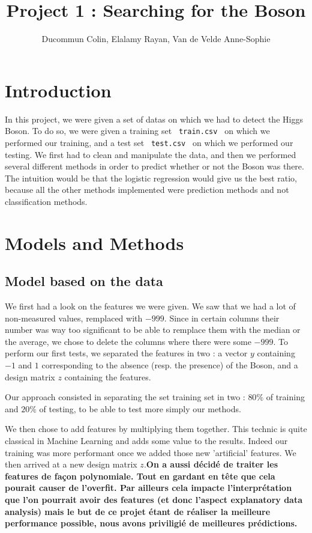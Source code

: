 \documentclass[11pt, oneside]{article}   	%
\title{Project 1 : Searching for the Boson}
\author{Ducommun Colin, Elalamy Rayan, Van de Velde Anne-Sophie}
\begin{document}
\maketitle
\section{Introduction}
In this project, we were given a set of datas on which we had to detect the Higgs Boson. To do so, we were given a training set \lstinline! train.csv ! on which we performed our training, and a test set \lstinline" test.csv " on which we performed our testing. We first had to clean and manipulate the data, and then we performed several different methods in order to predict whether or not the Boson was there. The intuition would be that the logistic regression would give us the best ratio, because all the other methods implemented were prediction methods and not classification methods.

\section{Models and Methods}

\subsection{Model based on the data}
We first had a look on the features we were given. We saw that we had a lot of non-measured values, remplaced with $-999$. Since in certain columns their number was way too significant to be able to remplace them with the median or the average, we chose to delete the columns where there were some $-999$. To perform our first tests, we separated the features in two : a vector $y$ containing $-1$ and $1$ corresponding to the absence (resp. the presence) of the Boson, and a design matrix $z$ containing the features.

Our approach consisted in separating the set training set in two : $80\%$ of training and $20\%$ of testing, to be able to test more simply our methods. 

We then chose to add features by multiplying them together. This technic is quite classical in Machine Learning and adds some value to the results. Indeed our training was more performant once we added those new 'artificial' features. We then arrived at a new design matrix $z$.\textbf{On a aussi décidé de traiter les features de façon polynomiale. Tout en gardant en tête que cela pourait causer de l'overfit. Par ailleurs cela impacte l'interprétation que l'on pourrait avoir des features (et donc l'aspect explanatory data analysis) mais le but de ce projet étant de réaliser la meilleure performance possible, nous avons priviligié de meilleures prédictions.}
\end{document}
